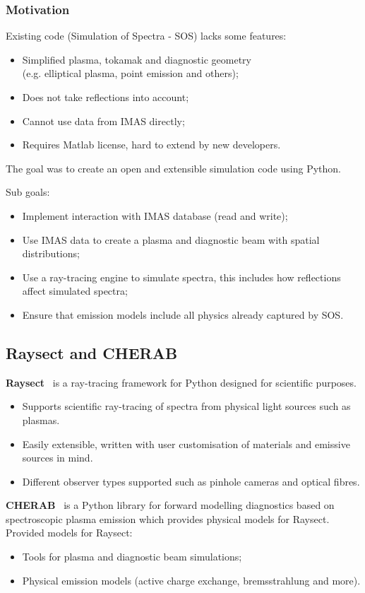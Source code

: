 \documentclass[../main.tex]{subfiles}
\begin{document}
\subsubsection{Motivation}
Existing code (Simulation of Spectra - SOS) lacks some features:
\begin{itemize}
    \item Simplified plasma, tokamak and diagnostic geometry \\
          (e.g. elliptical plasma, point emission and others);
    \item Does not take reflections into account;
    \item Cannot use data from IMAS directly;
    \item Requires Matlab license, hard to extend by new developers.
\end{itemize}

The goal was to create an open and extensible simulation code using Python.

Sub goals:
\begin{itemize}
    \item Implement interaction with IMAS database (read and write);
    \item Use IMAS data to create a plasma and diagnostic beam with spatial distributions;
    \item Use a ray-tracing engine to simulate spectra, this includes how reflections affect simulated spectra;
    \item Ensure that emission models include all physics already captured by SOS.
\end{itemize}


\subsection{Raysect and CHERAB}

\textbf{Raysect}~\cite{raysect} is a ray-tracing framework for Python designed for scientific purposes.
\begin{itemize}
    \item Supports scientific ray-tracing of spectra from physical light sources such as plasmas.
    \item Easily extensible, written with user customisation of materials and emissive sources in mind.
    \item Different observer types supported such as pinhole cameras and optical fibres.
\end{itemize}

\textbf{CHERAB}~\cite{cherab} is a Python library for forward modelling diagnostics based on spectroscopic plasma emission which provides physical models for Raysect.
Provided models for Raysect:
\begin{itemize}
    \item Tools for plasma and diagnostic beam simulations;
    \item Physical emission models (active charge exchange, bremsstrahlung and more).
\end{itemize}
\end{document}
